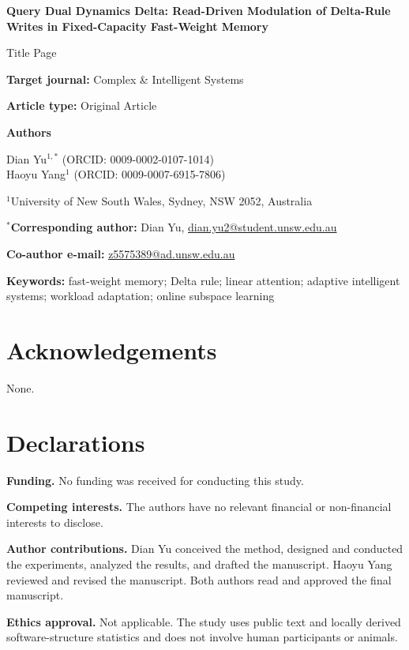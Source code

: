 \documentclass[11pt,a4paper]{article}
\begin{document}
\begin{center}
{\Large\bfseries Query Dual Dynamics Delta: Read-Driven Modulation of Delta-Rule Writes in Fixed-Capacity Fast-Weight Memory\par}
\vspace{1.2em}
{\large Title Page\par}
\end{center}

\textbf{Target journal:} Complex \& Intelligent Systems

\textbf{Article type:} Original Article

\textbf{Authors}

Dian Yu$^{1,*}$ (ORCID: 0009-0002-0107-1014)\\
Haoyu Yang$^{1}$ (ORCID: 0009-0007-6915-7806)

$^{1}$University of New South Wales, Sydney, NSW 2052, Australia

$^{*}$\textbf{Corresponding author:} Dian Yu, \href{mailto:dian.yu2@student.unsw.edu.au}{dian.yu2@student.unsw.edu.au}

\textbf{Co-author e-mail:} \href{mailto:z5575389@ad.unsw.edu.au}{z5575389@ad.unsw.edu.au}

\textbf{Keywords:} fast-weight memory; Delta rule; linear attention; adaptive intelligent systems; workload adaptation; online subspace learning

\section*{Acknowledgements}

None.

\section*{Declarations}

\textbf{Funding.} No funding was received for conducting this study.

\textbf{Competing interests.} The authors have no relevant financial or non-financial interests to disclose.

\textbf{Author contributions.} Dian Yu conceived the method, designed and conducted the experiments, analyzed the results, and drafted the manuscript. Haoyu Yang reviewed and revised the manuscript. Both authors read and approved the final manuscript.

\textbf{Ethics approval.} Not applicable. The study uses public text and locally derived software-structure statistics and does not involve human participants or animals.
\end{document}
